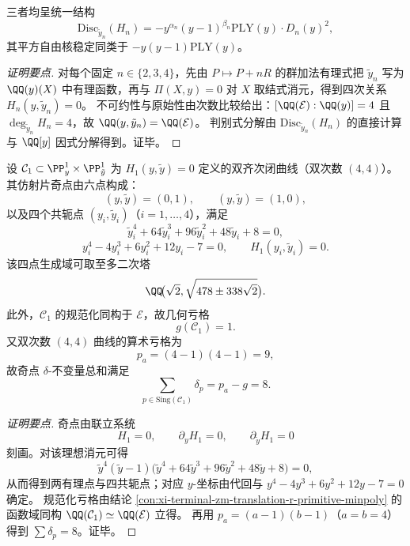 \begin{conclusion}[平移 \texorpdfstring{$nR$}{nR}（\texorpdfstring{$n=2,3,4$}{n=2,3,4}）的四次原始关系与统一判别式核]
三者均呈统一结构
\[
\mathrm{Disc}_{\tilde y_n}(H_n)
=-y^{\alpha_n}(y-1)^{\beta_n}\mathrm{PLY}(y)\cdot D_n(y)^2,
\]
其平方自由核稳定同类于 \(-y(y-1)\mathrm{PLY}(y)\)。
\end{conclusion}
\begin{proof}[证明要点]
对每个固定 \(n\in\{2,3,4\}\)，先由 \(P\mapsto P+nR\) 的群加法有理式把 \(\tilde y_n\) 写为 \(\QQ(y)(X)\) 中有理函数，再与 \(\Pi(X,y)=0\) 对 \(X\) 取结式消元，得到四次关系 \(H_n(y,\tilde y_n)=0\)。
不可约性与原始性由次数比较给出：\([\QQ(\mathcal E):\QQ(y)]=4\) 且 \(\deg_{\tilde y_n}H_n=4\)，故 \(\QQ(y,\tilde y_n)=\QQ(\mathcal E)\)。
判别式分解由 \(\mathrm{Disc}_{\tilde y_n}(H_n)\) 的直接计算与 \(\QQ[y]\) 因式分解得到。证毕。
\end{proof}

\begin{conclusion}[\texorpdfstring{$\mathcal C_{1}=\{H_{1}=0\}$}{C1={H1=0}} 的奇点谱与几何亏格]\label{con:xi-terminal-zm-translation-r-curve-singularity-genus}
设 \(\mathcal C_{1}\subset \PP^{1}_{y}\times\PP^{1}_{\tilde y}\) 为 \(H_{1}(y,\tilde y)=0\) 定义的双齐次闭曲线（双次数 \((4,4)\)）。
其仿射片奇点由六点构成：
\[
(y,\tilde y)=(0,1),\qquad (y,\tilde y)=(1,0),
\]
以及四个共轭点 \((y_i,\tilde y_i)\)（\(i=1,\dots,4\)），满足
\[
\tilde y_i^{4}+64\tilde y_i^{3}+96\tilde y_i^{2}+48\tilde y_i+8=0,
\]
\[
y_i^{4}-4y_i^{3}+6y_i^{2}+12y_i-7=0,
\qquad
H_{1}(y_i,\tilde y_i)=0.
\]
该四点生成域可取至多二次塔
\[
\QQ\!\bigl(\sqrt2,\sqrt{478\pm 338\sqrt2}\bigr).
\]
此外，\(\mathcal C_{1}\) 的规范化同构于 \(\mathcal E\)，故几何亏格
\[
g(\mathcal C_{1})=1.
\]
又双次数 \((4,4)\) 曲线的算术亏格为
\[
p_a=(4-1)(4-1)=9,
\]
故奇点 \(\delta\)-不变量总和满足
\[
\sum_{p\in\mathrm{Sing}(\mathcal C_{1})}\delta_{p}=p_a-g=8.
\]
\end{conclusion}
\begin{proof}[证明要点]
奇点由联立系统
\[
H_{1}=0,\qquad \partial_{y}H_{1}=0,\qquad \partial_{\tilde y}H_{1}=0
\]
刻画。对该理想消元可得
\[
\tilde y^{4}(\tilde y-1)\bigl(\tilde y^{4}+64\tilde y^{3}+96\tilde y^{2}+48\tilde y+8\bigr)=0,
\]
从而得到两有理点与四共轭点；对应 \(y\)-坐标由代回与
\(
y^{4}-4y^{3}+6y^{2}+12y-7=0
\)
确定。
规范化亏格由结论 \ref{con:xi-terminal-zm-translation-r-primitive-minpoly} 的函数域同构
\(\QQ(\mathcal C_{1})\simeq\QQ(\mathcal E)\) 立得。
再用 \(p_a=(a-1)(b-1)\)（\(a=b=4\)）得到 \(\sum\delta_p=8\)。证毕。
\end{proof}

